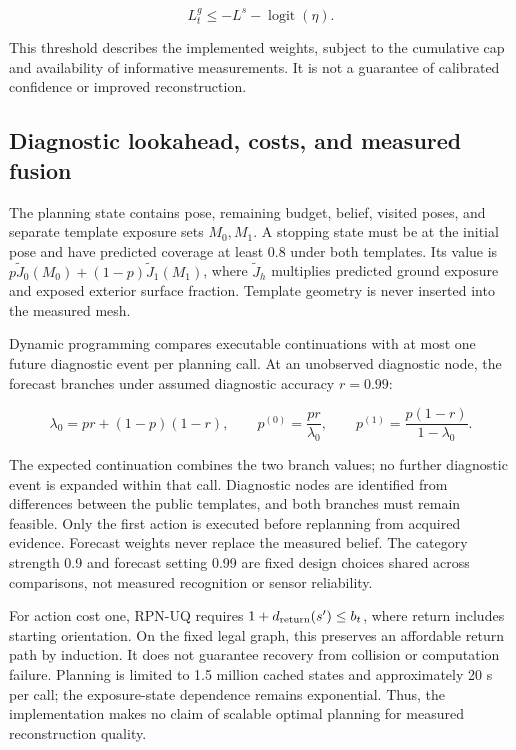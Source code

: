 \documentclass[pdflatex,sn-mathphys-num]{sn-jnl}
\begin{document}
\[
L_t^g\le-L^s-\operatorname{logit}(\eta).
\]

This threshold describes the implemented weights, subject to the cumulative cap and availability of informative measurements. It is not a guarantee of calibrated confidence or improved reconstruction.

\hypertarget{diagnostic-lookahead-costs-and-measured-fusion}{%
\subsection{Diagnostic lookahead, costs, and measured fusion}\label{diagnostic-lookahead-costs-and-measured-fusion}}

The planning state contains pose, remaining budget, belief, visited poses, and separate template exposure sets \(M_0,M_1\). A stopping state must be at the initial pose and have predicted coverage at least 0.8 under both templates. Its value is \(p\widetilde J_0(M_0)+(1-p)\widetilde J_1(M_1)\), where \(\widetilde J_h\) multiplies predicted ground exposure and exposed exterior surface fraction. Template geometry is never inserted into the measured mesh.

Dynamic programming compares executable continuations with at most one future diagnostic event per planning call. At an unobserved diagnostic node, the forecast branches under assumed diagnostic accuracy \(r=0.99\):

\[
\lambda_0=pr+(1-p)(1-r),\qquad
p^{(0)}=\frac{pr}{\lambda_0},\qquad
p^{(1)}=\frac{p(1-r)}{1-\lambda_0}.
\]

The expected continuation combines the two branch values; no further diagnostic event is expanded within that call. Diagnostic nodes are identified from differences between the public templates, and both branches must remain feasible. Only the first action is executed before replanning from acquired evidence. Forecast weights never replace the measured belief. The category strength 0.9 and forecast setting 0.99 are fixed design choices shared across comparisons, not measured recognition or sensor reliability.

For action cost one, RPN-UQ requires \(1+d_{\rm return}(s')\le b_t\), where return includes starting orientation. On the fixed legal graph, this preserves an affordable return path by induction. It does not guarantee recovery from collision or computation failure. Planning is limited to 1.5 million cached states and approximately 20 s per call; the exposure-state dependence remains exponential. Thus, the implementation makes no claim of scalable optimal planning for measured reconstruction quality.
\end{document}
